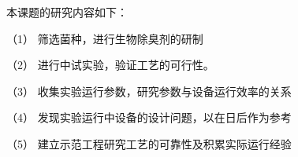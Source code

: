 本课题的研究内容如下：\par
（1）	筛选菌种，进行生物除臭剂的研制\par
（2）	进行中试实验，验证工艺的可行性。\par
（3）	收集实验运行参数，研究参数与设备运行效率的关系\par
（4）	发现实验运行中设备的设计问题，以在日后作为参考\par
（5）	建立示范工程研究工艺的可靠性及积累实际运行经验\par